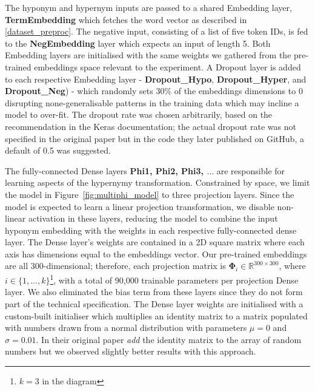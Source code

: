 The hyponym and hypernym inputs are passed to a shared Embedding layer, \textbf{TermEmbedding} which fetches the word vector as described in \cref{dataset_preproc}.  The negative input, consisting of a list of five token IDs, is fed to the \textbf{NegEmbedding} layer which expects an input of length 5.  Both Embedding layers are initialised with the same weights we gathered from the pre-trained embeddings space relevant to the experiment.  A Dropout layer is added to each respective Embedding layer - \textbf{Dropout\_Hypo}, \textbf{Dropout\_Hyper}, and \textbf{Dropout\_Neg}) - which randomly sets 30\% of the embeddings dimensions to 0 disrupting none-generalisable patterns in the training data which may incline a model to over-fit.  The dropout rate was chosen arbitrarily, based on the recommendation in the Keras documentation; the actual dropout rate was not specified in the original paper \citep{bernier2018crim} but in the code they later published on GitHub, a default of 0.5 was suggested.

The fully-connected Dense layers \textbf{Phi1, Phi2, Phi3, $\ldots$} are responsible for learning aspects of the hypernymy transformation.  Constrained by space, we limit the model in Figure~\ref{fig:multiphi_model} to  three projection layers.  Since the model is expected to learn a linear projection transformation, we disable non-linear activation in these layers, reducing the model to combine the input hyponym embedding with the weights in each respective fully-connected dense layer.  The Dense layer's weights are contained in a 2D square matrix where each axis has dimensions equal to the embeddings vector.  Our pre-trained embeddings are all 300-dimensional; therefore, each projection matrix is $\bm{\Phi}_i \in \mathbb{R}^{300 \times 300}$, where $i \in \{1,\ldots,k\}$\footnote{$k=3$ in the diagram}, with a total of 90,000 trainable parameters per projection Dense layer.  We also eliminated the bias term from these layers since they do not form part of the technical specification.  The Dense layer weights are initialised with a custom-built initialiser which multiplies an identity matrix to a matrix populated with numbers drawn from a normal distribution with parameters $\mu=0$ and $\sigma=0.01$.  In their original paper \citet{bernier2018crim} \textit{add} the identity matrix to the array of random numbers but we observed slightly better results with this approach.

